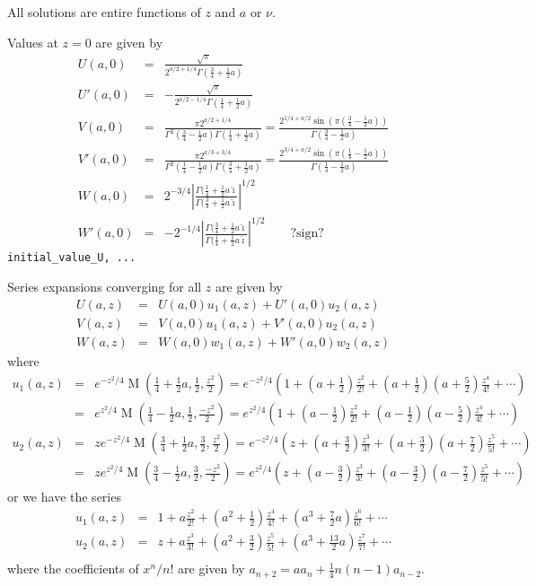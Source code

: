 \documentclass[10pt,dvipdfmx,letterpaper,twoside]{article}
\let\O=\operatorname
\newcommand{\ii}{{\hat{\imath}}}
\let\Gam=\Gamma
\begin{document}
All solutions are entire functions of $z$ and $a$ or $\nu$.

Values at $z=0$ are given by
\begin{eqnarray*}
U(a,0)  &=& \frac{\sqrt\pi}{2^{a/2+1/4}\Gam(\tfrac34+\tfrac12a)} \\
U'(a,0) &=& -\frac{\sqrt\pi}{2^{a/2-1/4}\Gam(\tfrac14+\tfrac12a)} \\
V(a,0)  &=& \frac{\pi 2^{a/2+1/4}}{\Gam^2(\tfrac34-\tfrac12a)\Gam(\tfrac14+\tfrac12a)}
    = \frac{2^{1/4 + a/2} \sin(\pi(\tfrac34 - \tfrac12a))}{\Gam(\tfrac34 - \tfrac12a)} \\
V'(a,0) &=& \frac{\pi 2^{a/3+3/4}}{\Gam^2(\tfrac14-\tfrac12a)\Gam(\tfrac34+\tfrac12a)}
    = \frac{2^{3/4 + a/2} \sin(\pi(\tfrac14 - \tfrac12a))}{\Gam(\tfrac14 - \tfrac12a)} \\
W(a,0) &=& 2^{-3/4}\left|\frac{\Gamma(\tfrac14+\tfrac12a\ii}{\Gamma(\tfrac34+\tfrac12a\ii}\right|^{1/2} \\
W'(a,0) &=& -2^{-1/4}\left|\frac{\Gamma(\tfrac34+\tfrac12a\ii}{\Gamma(\tfrac14+\tfrac12a\ii}\right|^{1/2} \qquad\text{?sign?}
\end{eqnarray*}
{\tt initial\_value\_U, ...}

Series expansions converging for all $z$ are given by
\begin{eqnarray*}
U(a,z) &=& U(a,0)u_1(a,z) + U'(a,0)u_2(a,z) \\
V(a,z) &=& V(a,0)u_1(a,z) + V'(a,0)u_2(a,z) \\
W(a,z) &=& W(a,0)w_1(a,z) + W'(a,0)w_2(a,z)
\end{eqnarray*}
where
\begin{eqnarray*}
u_1(a,z)
  &=& e^{-z^2/4} \O{M}(\tfrac14 + \tfrac12a, \tfrac12, \frac{z^2}{2}) 
      = e^{-z^2/4}\left(1+(a+\tfrac12)\frac{z^2}{2!}+(a+\tfrac12)(a+\tfrac52)\frac{z^4}{4!}+\cdots\right) \\
  &=& e^{z^2/4} \O{M}(\tfrac14 - \tfrac12a, \tfrac12, \frac{-z^2}{2}) 
      = e^{z^2/4}\left(1+(a-\tfrac12)\frac{z^2}{2!}+(a-\tfrac12)(a-\tfrac52)\frac{z^4}{4!}+\cdots\right) \\
u_2(a,z)
  &=& z e^{-z^2/4} \O{M}(\tfrac34 + \tfrac12a, \tfrac32, \frac{z^2}{2}) 
      = e^{-z^2/4}\left(z+(a+\tfrac32)\frac{z^3}{3!}+(a+\tfrac32)(a+\tfrac72)\frac{z^5}{5!}+\cdots\right) \\
  &=& z e^{z^2/4} \O{M}(\tfrac34 - \tfrac12a, \tfrac32, \frac{-z^2}{2}) 
      = e^{z^2/4}\left(z+(a-\tfrac32)\frac{z^3}{3!}+(a-\tfrac32)(a-\tfrac72)\frac{z^5}{5!}+\cdots\right)
\end{eqnarray*}
or we have the series
\begin{eqnarray*}
u_1(a,z) &=& 1 + a\frac{z^2}{2!} + (a^2 + \tfrac12)\frac{z^4}{4!} + (a^3 + \tfrac72a)\frac{z^6}{6!} + \cdots \\
u_2(a,z) &=& z + a\frac{z^3}{3!} + (a^2 + \tfrac32)\frac{z^5}{5!} + (a^3 + \tfrac{13}2a)\frac{z^7}{7!} + \cdots \\
\end{eqnarray*}
where the coefficients of $x^n/n!$ are given by $a_{n+2} = a a_n + \tfrac14n(n-1)a_{n-2}$.
\end{document}
